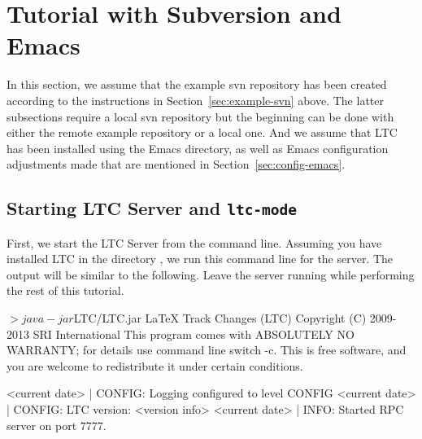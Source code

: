\section{Tutorial with Subversion and Emacs} \label{sec:tutorial-svn-emacs}

In this section, we assume that the example svn repository has been created according to the instructions in Section~\ref{sec:example-svn} above.  The latter subsections require a local svn repository but the beginning can be done with either the remote example repository or a local one.  And we assume that LTC has been installed using the Emacs directory, as well as Emacs configuration adjustments made that are mentioned in Section~\ref{sec:config-emacs}.

\subsection{Starting LTC Server and \texttt{ltc-mode}}

First, we start the LTC Server from the command line.  Assuming you have installed LTC in the directory , we run this command line for the server.  The output will be similar to the following.  Leave the server running while performing the rest of this tutorial.
\begin{CodeVerbatim}
$> java -jar $LTC/LTC.jar
LaTeX Track Changes (LTC)  Copyright (C) 2009-2013  SRI International
This program comes with ABSOLUTELY NO WARRANTY; for details use command line switch -c.
This is free software, and you are welcome to redistribute it under certain conditions.

<current date> | CONFIG:  Logging configured to level CONFIG
<current date> | CONFIG:  LTC version: <version info>
<current date> | INFO:    Started RPC server on port 7777.
\end{CodeVerbatim}

